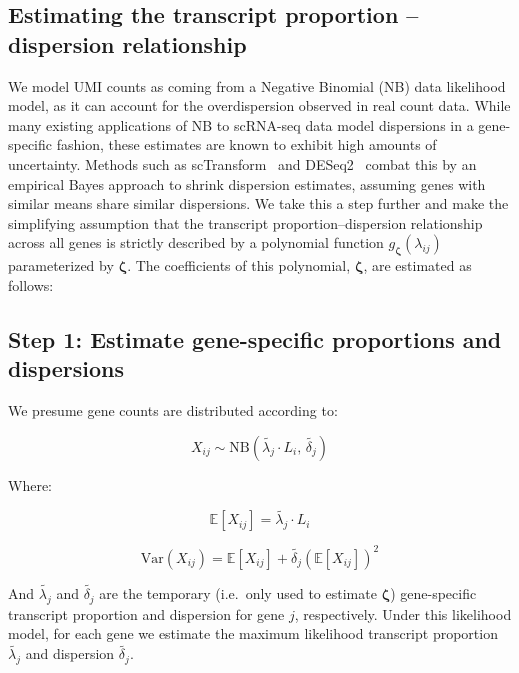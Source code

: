 \documentclass[12pt]{article}
\begin{document}
\subsection*{Estimating the transcript proportion -- dispersion relationship}

We model UMI counts as coming from a Negative Binomial (NB) data likelihood model, as it can account
for the overdispersion observed in real count data. While many existing applications of NB to
scRNA-seq data model dispersions in a gene-specific fashion, these estimates are known to exhibit
high amounts of uncertainty. Methods such as scTransform~\cite{ref134} and DESeq2~\cite{ref135}
combat this by an empirical Bayes approach to shrink dispersion estimates, assuming genes with
similar means share similar dispersions. We take this a step further and make the simplifying
assumption that the transcript proportion--dispersion relationship across all genes is strictly
described by a polynomial function $g_{\boldsymbol{\zeta}}\!\left( \lambda_{ij} \right)$
parameterized by $\boldsymbol{\zeta}$. The coefficients of this polynomial, $\boldsymbol{\zeta}$,
are estimated as follows:

\subsection*{Step 1: Estimate gene-specific proportions and dispersions}

We presume gene counts are distributed according to:

\begin{equation}
X_{ij} \sim \mathrm{NB}\!\left( \widetilde{\lambda_{j}} \cdot L_{i},\, \widetilde{\delta_{j}} \right) \tag{24}
\end{equation}

Where:

\begin{equation}
\mathbb{E}\!\left[ X_{ij} \right] = \widetilde{\lambda_{j}} \cdot L_{i} \tag{25}
\end{equation}

\begin{equation}
\mathrm{Var}\!\left( X_{ij} \right) = \mathbb{E}\!\left[ X_{ij} \right] + \widetilde{\delta_{j}} \left( \mathbb{E}\!\left[ X_{ij} \right] \right)^{2} \tag{26}
\end{equation}

And $\widetilde{\lambda_{j}}$ and $\widetilde{\delta_{j}}$ are the temporary (i.e.\ only used to
estimate $\boldsymbol{\zeta}$) gene-specific transcript proportion and dispersion for gene $j$,
respectively. Under this likelihood model, for each gene we estimate the maximum likelihood
transcript proportion $\widetilde{\lambda_{j}}$ and dispersion $\widetilde{\delta_{j}}$.
\end{document}

